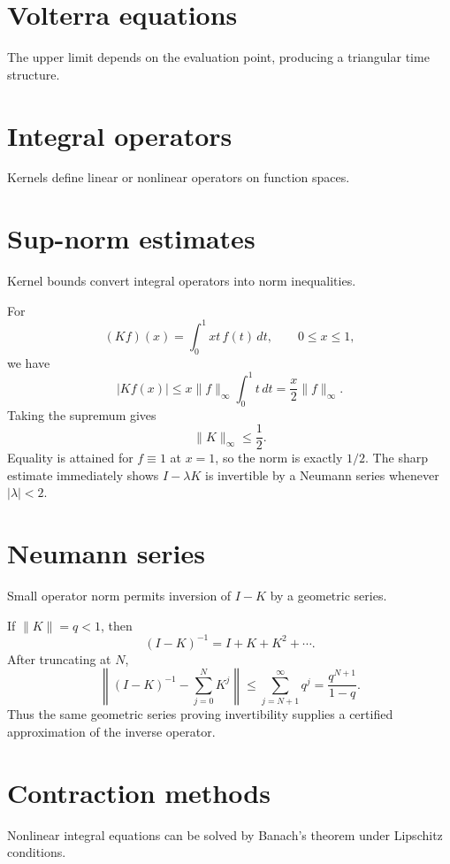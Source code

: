 \section{Volterra equations}
The upper limit depends on the evaluation point, producing a triangular time structure.

\section{Integral operators}
Kernels define linear or nonlinear operators on function spaces.

\section{Sup-norm estimates}
Kernel bounds convert integral operators into norm inequalities.


\begin{example}\label{ex:ii18-expand-01}
For
\[
(Kf)(x)=\int_0^1 xt\,f(t)\,dt,\qquad 0\le x\le1,
\]
we have
\[
|Kf(x)|\le x\|f\|_\infty\int_0^1t\,dt
=\frac{x}{2}\|f\|_\infty.
\]
Taking the supremum gives
\[
\|K\|_\infty\le\frac12.
\]
Equality is attained for \(f\equiv1\) at \(x=1\), so the norm is exactly
\(1/2\). The sharp estimate immediately shows \(I-\lambda K\) is invertible
by a Neumann series whenever \(|\lambda|<2\).
\end{example}
\section{Neumann series}
Small operator norm permits inversion of $I-K$ by a geometric series.


\begin{example}\label{ex:ii18-expand-02}
If \(\|K\|=q<1\), then
\[
(I-K)^{-1}=I+K+K^2+\cdots.
\]
After truncating at \(N\),
\[
\left\|(I-K)^{-1}-\sum_{j=0}^N K^j\right\|
\le\sum_{j=N+1}^\infty q^j
=\frac{q^{N+1}}{1-q}.
\]
Thus the same geometric series proving invertibility supplies a certified
approximation of the inverse operator.
\end{example}
\section{Contraction methods}
Nonlinear integral equations can be solved by Banach's theorem under Lipschitz conditions.

